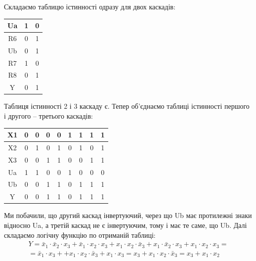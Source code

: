 \documentclass[a4paper,14pt]{extreport}
\begin{document}
	Складаємо таблицю істинності одразу для двох каскадів:

	\begin{table}[h]
	  \begin{center}
	  \begin{tabular}{|c|c|c|}
	  \hline
	  Ua & 1 & 0 \\ \hline
	  R6 & 0 & 1 \\ \hline
	  Ub & 0 & 1 \\ \hline
	  R7 & 1 & 0 \\ \hline
	  R8 & 0 & 1 \\ \hline
	  Y  & 0 & 1 \\ \hline
	  \end{tabular}
	  \end{center}
	\end{table}

	Таблиця істинності 2 і 3 каскаду є. Тепер об’єднаємо таблиці істинності першого і другого – третього каскадів:


	\begin{table}[h]
	  \begin{center}
	\begin{tabular}{|c|c|c|c|c|c|c|c|c|}
	\hline
	X1 & 0 & 0 & 0 & 0 & 1 & 1 & 1 & 1 \\ \hline
	X2 & 0 & 1 & 0 & 1 & 0 & 1 & 0 & 1 \\ \hline
	X3 & 0 & 0 & 1 & 1 & 0 & 0 & 1 & 1 \\ \hline
	Ua & 1 & 1 & 0 & 0 & 1 & 0 & 0 & 0 \\ \hline
	Ub & 0 & 0 & 1 & 1 & 0 & 1 & 1 & 1 \\ \hline
	Y  & 0 & 0 & 1 & 1 & 0 & 1 & 1 & 1 \\ \hline
	\end{tabular}
	  \end{center}
	\end{table}

	Ми побачили, що другий каскад інвертуючий, через що Ub має протилежні знаки відносно Ua, а третій каскад не є інвертуючим, тому і має те саме, що Ub.
	Далі складаємо логічну функцію по отриманій таблиці:
	\begin{equation}
	\begin{array}{l}
	Y=\bar{x}_{1} \cdot \bar{x}_{2} \cdot x_{3}+\bar{x}_{1} \cdot x_{2} \cdot x_{3}+x_{1} \cdot x_{2} \cdot \bar{x}_{3}+x_{1} \cdot \bar{x}_{2} \cdot x_{3}+x_{1} \cdot x_{2} \cdot x_{3}= \\
	=\bar{x}_{1} \cdot x_{3}++x_{1} \cdot x_{2} \cdot \bar{x}_{3}+x_{1} \cdot x_{3}=x_{3}+x_{1} \cdot x_{2} \cdot \bar{x}_{3}=x_{3}+x_{1} \cdot x_{2}
	\end{array}
	\end{equation}
\end{document}
